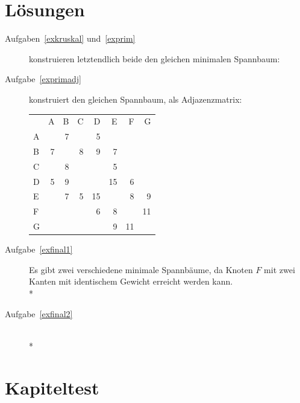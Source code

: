 \documentclass[12pt,a4paper]{report}
\theoremstyle{break}
\theoremstyle{plain}
\newcommand{\ucl}{\ding{56}}
\newcommand{\ign}{\rowcolor[gray]{0.5}}
\newcommand{\usd}[1]{{\cellcolor{SkyBlue}#1}}
\begin{document}
\newpage
\section{L\"{o}sungen}

\begin{description}
\item[Aufgaben~\ref{exkruskal} und~\ref{exprim}] konstruieren letztendlich beide
den gleichen minimalen Spannbaum:

\item[Aufgabe~\ref{exprimadj}] konstruiert den gleichen Spannbaum, als
  Adjazenzmatrix:

\begin{tabular}{|l|r|r|r|r|r|r|r|}\hline
   & \ucl & \ucl  & \ucl & \ucl & \ucl & \ucl   & \ucl \\ \hline
   & A & B & C & D & E & F & G \\ \hline
\ign A &   & \usd{7} &   & \usd{5} &   &    &    \\
\ign B & \usd{7} &   & 8 & 9 & \usd{7} &   &   \\
\ign C &   & 8 &   &   & \usd{5} &   &   \\
\ign D & \usd{5} & 9 &   &   &15 & \usd{6} &   \\
\ign E &   & \usd{7} & \usd{5} &15 &   & 8 & \usd{9} \\
\ign F &   &   &   & \usd{6} & 8 &   &11 \\
\ign G &   &   &   &   & \usd{9} &11 & \\ 
\hline
\end{tabular}

\item[Aufgabe~\ref{exfinal1}]Es gibt zwei verschiedene minimale
  Spannb\"{a}ume, da Knoten $F$ mit zwei Kanten mit identischem
  Gewicht erreicht werden kann.\\*

\pagebreak
\item[Aufgabe~\ref{exfinal2}]\hfill\\*

\end{description}
\pagebreak

\section{Kapiteltest}
\end{document}
